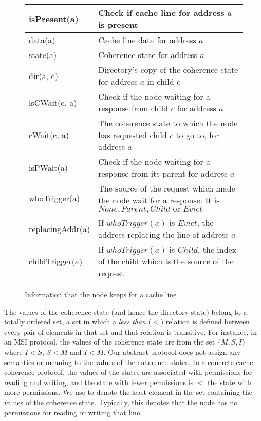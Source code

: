 \begin{figure}
\begin{tabular}{|l|p{}|}
\hline
isPresent(a) & Check if cache line for address $a$ is present\\
\hline
data(a) & Cache line data for address $a$\\
\hline
state(a) & Coherence state for address $a$\\
\hline
dir(a, c) & Directory's copy of the coherence state for address $a$ in child
$c$\\
\hline
isCWait(c, a) & Check if the node waiting for a response from child $c$
for address $a$\\
\hline
cWait(c, a) & The coherence state to which the node has requested child $c$ to
go to, for address $a$\\
\hline
isPWait(a) & Check if the node waiting for a response from its parent for
address $a$\\
\hline
whoTrigger(a) & The source of the request which made the node wait for a
response. It is $None, Parent, Child \text{ or } Evict$\\
\hline
replacingAddr(a) & If $whoTrigger(a)$ is $Evict$, the address replacing the line
of address $a$\\
\hline
childTrigger(a) & If $whoTrigger(a)$ is $Child$, the index of the child which
is the source of the request\\
\hline
\end{tabular}
\caption{Information that the node keeps for a cache line}
\label{table:states}
\end{figure}

The values of the coherence state (and hence the directory state) belong to a
totally ordered set, \ie a set in which a \emph{less than} ($<$) relation is
defined between every pair of elements in that set and that relation is
transitive. For instance, in an MSI protocol, the values of the coherence state
are from the set $\{M, S, I\}$ where $I < S$, $S < M$ and $I < M$. Our abstract
protocol does not assign any semantics or meaning to the values of the coherence
states. In a concrete cache coherence protocol, the values of the states are
associated with permissions for reading and writing, and the state with fewer
permissions is $<$ the state with more permissions. We use \Inv to denote the
least element in the set containing the values of the coherence state.
Typically, this denotes that the node has no permissions for reading or writing
that line.

